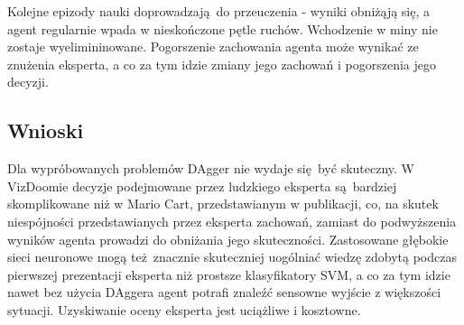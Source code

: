 Kolejne epizody nauki doprowadzają do przeuczenia - wyniki obniżąją się, a agent regularnie wpada w nieskończone pętle ruchów. Wchodzenie w miny nie zostaje wyelimininowane. Pogorszenie zachowania agenta może wynikać ze znużenia eksperta, a co za tym idzie zmiany jego zachowań i pogorszenia jego decyzji.

\subsection{Wnioski}
Dla wypróbowanych problemów DAgger nie wydaje się być skuteczny. W VizDoomie decyzje podejmowane przez ludzkiego eksperta są bardziej skomplikowane niż w Mario Cart, przedstawianym w publikacji, co, na skutek niespójności przedstawianych przez eksperta zachowań, zamiast do podwyższenia wyników agenta prowadzi do obniżania jego skuteczności. Zastosowane głębokie sieci neuronowe mogą też znacznie skuteczniej uogólniać wiedzę zdobytą podczas pierwszej prezentacji eksperta niż prostsze klasyfikatory SVM, a co za tym idzie nawet bez użycia DAggera agent potrafi znaleźć sensowne wyjście z większości sytuacji. Uzyskiwanie oceny eksperta jest uciążliwe i kosztowne.

